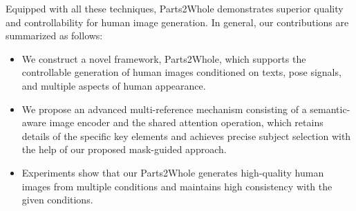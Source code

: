 Equipped with all these techniques, Parts2Whole demonstrates superior quality and controllability for human image generation. In general, our contributions are summarized as follows:

\begin{itemize}
\item We construct a novel framework, Parts2Whole, which supports the controllable generation of human images conditioned on texts, pose signals, and multiple aspects of human appearance.
\item We propose an advanced multi-reference mechanism consisting of a semantic-aware image encoder and the shared attention operation, which retains details of the specific key elements and achieves precise subject selection with the help of our proposed mask-guided approach.
\item Experiments show that our Parts2Whole generates high-quality human images from multiple conditions and maintains high consistency with the given conditions.
\end{itemize}